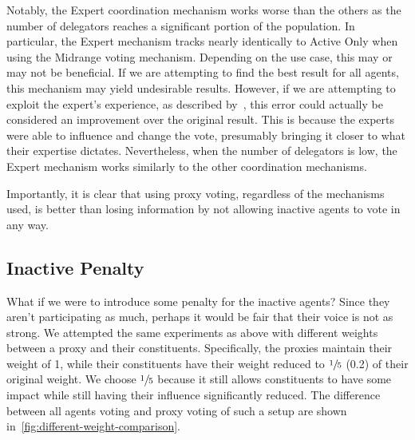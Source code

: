 Notably, the Expert coordination mechanism works worse than the others as the number
of delegators reaches a significant portion of the population.
In particular, the Expert mechanism tracks nearly identically to Active Only when
using the Midrange voting mechanism.
Depending on the use case, this may or may not be beneficial.
If we are attempting to find the best result for all agents, this mechanism may yield
undesirable results.
However, if we are attempting to exploit the expert's experience, as described
by~\cite{Miller1969}, this error could actually be considered an improvement over
the original result.
This is because the experts were able to influence and change the vote, presumably
bringing it closer to what their expertise dictates.
Nevertheless, when the number of delegators is low, the Expert mechanism works
similarly to the other coordination mechanisms.

Importantly, it is clear that using proxy voting, regardless of the mechanisms used,
is better than losing information by not allowing inactive agents to vote in any way.

\subsection{Inactive Penalty}\label{subsec:inactive-penalty}
What if we were to introduce some penalty for the inactive agents?
Since they aren't participating as much, perhaps it would be fair that their voice is
not as strong.
We attempted the same experiments as above with different weights between a proxy and
their constituents.
Specifically, the proxies maintain their weight of 1, while their constituents have
their weight reduced to $\sfrac{1}{5}$ (0.2) of their original weight.
We choose $\sfrac{1}{5}$ because it still allows constituents to have some impact
while still having their influence significantly reduced.
The difference between all agents voting and proxy voting of such a setup are
shown in~\autoref{fig:different-weight-comparison}.

